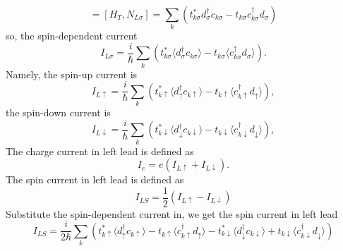 \documentclass[11pt,a4paper]{article}
\begin{document}
\begin{equation}
[H, N_{L\sigma}] = [H_{T}, N_{L\sigma}] =  \sum_{k}\left(t_{k \sigma}^{*} d_{\sigma}^{\dagger} c_{k \sigma} - t_{k \sigma} c_{k \sigma}^{\dagger} d_{\sigma} \right)
\end{equation}
so, the spin-dependent current
\begin{equation}
I_{L\sigma} = \frac{i}{\hbar} \sum_{k} \left( t_{k \sigma}^{*} \langle  d_{\sigma}^{\dagger} c_{k \sigma}\rangle - t_{k \sigma} \langle c_{k \sigma}^{\dagger} d_{\sigma} \rangle \right).
\end{equation}
Namely, the spin-up current is
\begin{equation}
I_{L\uparrow} = \frac{i}{\hbar} \sum_{k} \left( t_{k \uparrow}^{*} \langle  d_{\uparrow}^{\dagger} c_{k \uparrow}\rangle - t_{k \uparrow} \langle c_{k \uparrow}^{\dagger} d_{\uparrow} \rangle \right),
\end{equation}
the spin-down current is
\begin{equation}
I_{L\downarrow} = \frac{i}{\hbar} \sum_{k} \left( t_{k \downarrow}^{*} \langle  d_{\downarrow}^{\dagger} c_{k \downarrow}\rangle - t_{k \downarrow} \langle c_{k \downarrow}^{\dagger} d_{\downarrow} \rangle \right),
\end{equation}
The charge current in left lead is defined as
\begin{equation}
I_{e} = e(I_{L\uparrow} + I_{L\downarrow}).
\end{equation}
The spin current in left lead is defined as
\begin{equation}
I_{LS} = \frac{1}{2}(I_{L\uparrow} - I_{L\downarrow})
\end{equation}
Substitute the spin-dependent current in, we get the spin current in left lead
\begin{equation}
I_{LS} = \frac{i}{2\hbar} \sum_{k} \left( t_{k \uparrow}^{*} \langle  d_{\uparrow}^{\dagger} c_{k \uparrow}\rangle - t_{k \uparrow} \langle c_{k \uparrow}^{\dagger} d_{\uparrow} \rangle -  t_{k \downarrow}^{*} \langle  d_{\downarrow}^{\dagger} c_{k \downarrow}\rangle + t_{k \downarrow} \langle c_{k \downarrow}^{\dagger} d_{\downarrow} \rangle \right)
\end{equation}
\end{document}
